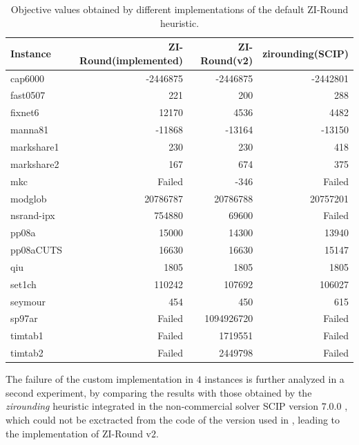 \documentclass[a4paper,12pt]{book}
\begin{document}
\begin{table}[]
	\centering
	\begin{tabular}{@{}lrrr@{}}
	\toprule
	Instance   & ZI-Round(implemented) & ZI-Round(v2) & zirounding(SCIP) \\ \midrule
	cap6000    & -2446875              & -2446875     & -2442801         \\
	fast0507   & 221                   & 200          & 288              \\
	fixnet6    & 12170                 & 4536         & 4482             \\
	manna81    & -11868                & -13164       & -13150           \\
	markshare1 & 230                   & 230          & 418              \\
	markshare2 & 167                   & 674          & 375              \\
	mkc        & Failed                & -346      & Failed           \\
	modglob    & 20786787           & 20786788     & 20757201      \\
	nsrand-ipx & 754880                & 69600        & Failed           \\
	pp08a      & 15000                 & 14300        & 13940            \\
	pp08aCUTS  & 16630           & 16630      & 15147      \\
	qiu        & 1805           & 1805      & 1805      \\
	set1ch     & 110242              & 107692     & 106027           \\
	seymour    & 454                   & 450          & 615              \\
	sp97ar     & Failed                & 1094926720   & Failed           \\
	timtab1    & Failed                & 1719551      & Failed           \\
	timtab2    & Failed                & 2449798      & Failed           \\ \bottomrule
	\end{tabular}
	\caption{Objective values obtained by different implementations of the default ZI-Round heuristic.}
	\label{tb:exp-prelim-1}
\end{table}

The failure of the custom implementation in $4$ instances is further analyzed in a second experiment, by comparing the results with those obtained by the \textit{zirounding} heuristic integrated in the non-commercial solver SCIP version $7$.$0$.$0$ \cite{scip}, which could not be exctracted from the code of the version used in \cite{wallace2010}, leading to the implementation of ZI-Round v$2$. \par 
\end{document}
